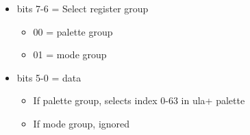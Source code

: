 \begin{itemize}
\item[] bits 7-6 = Select register group
\begin{itemize}
\item 00 = palette group
\item 01 = mode group
\end{itemize}
\item[] bits 5-0 = data
\begin{itemize}
\item[] If palette group, selects index 0-63 in ula+ palette
\item[] If mode group, ignored
\end{itemize}
\end{itemize}

